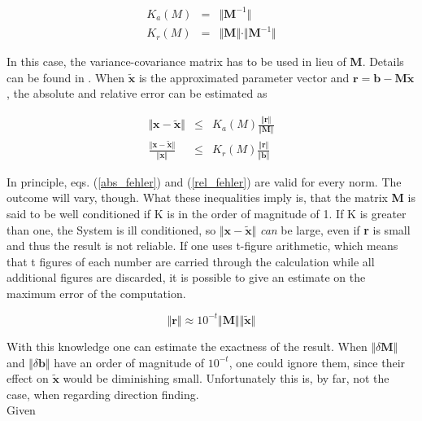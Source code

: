 \documentclass[a4paper,14pt]{extbook}
\begin{document}
\begin{eqnarray}
K_a(M)&=&\Vert \textbf{M}^{-1} \Vert  \label{K_a} \\
K_r(M)&=&\Vert \textbf{M} \Vert \cdot \Vert \textbf{M}^{-1} \Vert \label{K_r}
\end{eqnarray}

In this case, the variance-covariance matrix has to be used in lieu of \textbf{M}. Details can be found in \cite{burdenfaires}. When $\tilde{\textbf{x}}$ is the approximated parameter vector and $\textbf{r}=\textbf{b} - \textbf{M} \tilde{\textbf{x}}$, the absolute and relative error can be estimated as

\begin{eqnarray}\label{M}
\Vert \textbf{x} - \tilde{\textbf{x}}\Vert &\leq& K_a(M) \frac{\Vert \textbf{r} \Vert}{\Vert \textbf{M} \Vert}\label{abs_fehler}\\
\frac{\Vert \textbf{x} - \tilde{\textbf{x}}\Vert}{\Vert \textbf{x} \Vert} &\leq& K_r(M) \frac{\Vert \textbf{r} \Vert}{\Vert \textbf{b} \Vert} \label{rel_fehler}
\end{eqnarray}

In principle, eqs. (\ref{abs_fehler}) and (\ref{rel_fehler}) are valid for every norm. The outcome will vary, though. What these inequalities imply is, that the matrix \textbf{M} is said to be well conditioned if K is in the order of magnitude of 1. If K is greater than one, the System is ill conditioned, so $\Vert \textbf{x} - \tilde{\textbf{x}}\Vert$ \emph{can} be large, even if \textbf{r} is small and thus the result is not reliable. If one uses t-figure arithmetic, which means that t figures of each number are carried through the calculation while all additional figures are discarded, it is possible to give an estimate on the maximum error of the computation.

\begin{equation}
\Vert \textbf{r} \Vert \approx 10^{-t}
\Vert \textbf{M} \Vert \Vert \tilde{\textbf{x}} \Vert
\end{equation}

With this knowledge one can estimate the exactness of the result. When $\Vert \delta \textbf{M} \Vert$ and $\Vert \delta \textbf{b} \Vert$ have an order of magnitude of $10^{-t}$, one could ignore them, since their effect on $\tilde{\textbf{x}}$ would be diminishing small. Unfortunately this is, by far, not the case, when regarding direction finding.\\

Given
\end{document}
